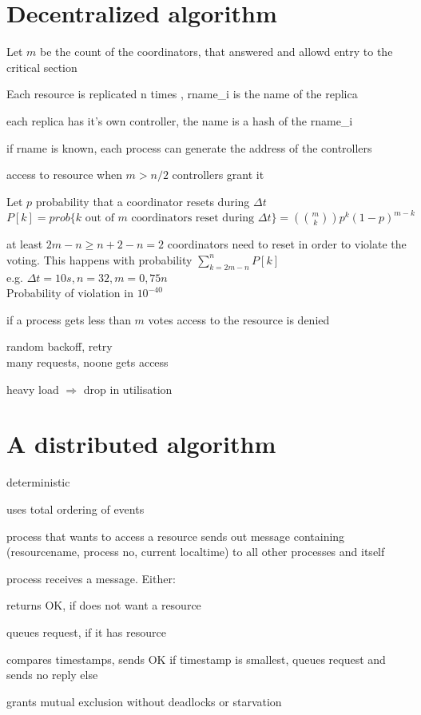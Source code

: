 \documentclass[ngerman,a4paper]{report}
\begin{document}
\section{Decentralized algorithm}
\begin{compactitem}
    \item Let $m$ be the count of the coordinators, that answered and allowd entry to the critical section
	\item Each resource is replicated n times , rname\_i is the name of the replica\\
	\item each replica has it's own controller, the name is a hash of the rname\_i
	\item if rname is known, each process can generate the address of the controllers
	\item access to resource when $m>n/2$ controllers grant it
	\item Let $p$ probability that a coordinator resets during $\Delta t$\\
		$P[k]= prob\lbrace k \text{ out of } m \text{ coordinators reset during } \Delta t\rbrace = \left( \binom{m}{k}\right) p^k (1-p)^{m-k}$
	\item at least $2m-n\geq n+2-n=2$ coordinators need to reset in order to violate the voting. This happens with probability $\sum\limits_{k=2m-n}^n P[k]$\\
		e.g. $\Delta t = 10s, n=32, m=0,75n$\\
		Probability of violation in $10^{-40}$
	\item if a process gets less than $m$ votes access to the resource is denied
	\item random backoff, retry\\
		many requests, noone gets access
	\item heavy load $\Rightarrow$ drop in utilisation
\end{compactitem}

\section{A distributed algorithm}
\begin{compactitem}
	\item deterministic
	\item uses total ordering of events
	\item process that wants to access a resource sends out message containing (resourcename, process no, current localtime) to all other processes and itself
	\item process receives a message. Either:\\
		\begin{compactenum}
			\item returns OK, if does not want a resource
			\item queues request, if it has resource
			\item compares timestamps, sends OK if timestamp is smallest, queues request and sends no reply else
		\end{compactenum}
	\item grants mutual exclusion without deadlocks or starvation
\end{compactitem}
\end{document}
